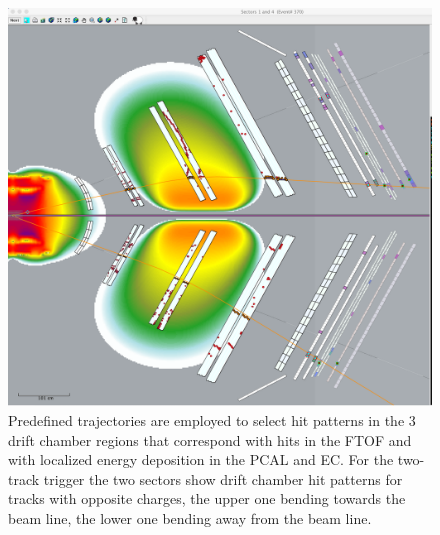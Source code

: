 \documentclass[final,3p,times,twocolumn,authoryear]{elsarticle}
\begin{document}
\begin{figure}[htbp!]
\centerline{\includegraphics[width=0.95\columnwidth]{trigger.png}}
\caption{Predefined trajectories are employed to select hit patterns
in the 3 drift chamber regions that correspond with hits in the FTOF and with localized energy deposition in the 
PCAL and EC. For the two-track trigger the two sectors show drift chamber hit patterns for tracks with opposite charges,
 the upper one bending towards the beam line, the lower one bending away from the beam line.  }
\label{trigger}
\end{figure}    
\end{document}
